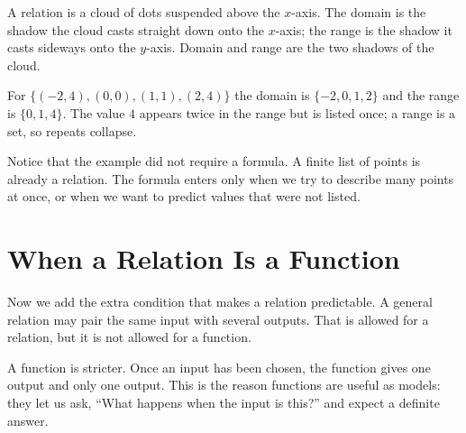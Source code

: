 \documentclass[12pt]{book}
\begin{document}
\begin{visual}
A relation is a cloud of dots suspended above the $x$-axis. The domain is the shadow
the cloud casts straight down onto the $x$-axis; the range is the shadow it casts
sideways onto the $y$-axis. Domain and range are the two shadows of the cloud.
\end{visual}

\begin{center}
\end{center}

\begin{example}
For $\{(-2,4),(0,0),(1,1),(2,4)\}$ the domain is $\{-2,0,1,2\}$ and the range is
$\{0,1,4\}$. The value $4$ appears twice in the range but is listed once; a range
is a set, so repeats collapse.
\end{example}

Notice that the example did not require a formula. A finite list of points is already
a relation. The formula enters only when we try to describe many points at once, or
when we want to predict values that were not listed.

\section{When a Relation Is a Function}

Now we add the extra condition that makes a relation predictable. A general relation
may pair the same input with several outputs. That is allowed for a relation, but it
is not allowed for a function.

A function is stricter. Once an input has been chosen, the function gives one output
and only one output. This is the reason functions are useful as models: they let us
ask, ``What happens when the input is this?'' and expect a definite answer.
\end{document}
